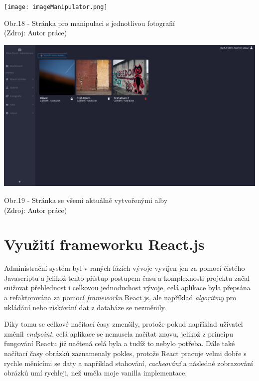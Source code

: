 \documentclass[12pt,a4paper]{report}
\begin{document}
  \vspace*{0.5cm}
  \noindent\texttt{[image: imageManipulator.png]}
  \begin{center}
    Obr.18 - Stránka pro manipulaci s jednotlivou fotografií \\
    (Zdroj: Autor práce)
  \end{center}
  \vspace*{0.5cm}

  \vspace*{0.5cm}
  \noindent\includegraphics[width=\linewidth]{albums.png}
  \begin{center}
    Obr.19 -  Stránka se všemi aktuálně vytvořenými alby \\
    (Zdroj: Autor práce)
  \end{center}
  \vspace*{0.5cm}

  \section{Využití frameworku React.js}
  Administrační systém byl v raných fázích vývoje vyvíjen jen za pomocí čistého Javascriptu a
  jelikož tento přístup postupem času a komplexnosti projektu začal snižovat přehlednost i 
  celkovou jednoduchost vývoje, celá aplikace byla přepsána a refaktorována za pomocí 
  \emph{frameworku} React.js, ale například \emph{algoritmy} pro ukládání nebo získávání dat z databáze se nezměnily.

  Díky tomu se celkové načítací časy zmenšily, protože pokud například uživatel změnil \emph{endpoint}, celá aplikace se 
  nemusela načítat znovu, jelikož z principu fungování Reactu již načtená celá byla a tudíž to nebylo potřeba. 
  Dále také načítací časy obrázků zaznamenaly pokles, protože React pracuje velmi dobře s rychle měnícími se
  daty a například stahování, \emph{cacheování} a následné zobrazování obrázků umí rychleji, než uměla moje vanilla implementace.
  
\end{document}
